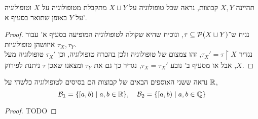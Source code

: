 \subquestion{}
תהיינה $X, Y$ קבוצות, נראה שכל טופולוגיה על $X \sqcup Y$ מתקבלת מטופולוגיה על $X$ וטופולוגיה על $Y$ באופן שתואר בסעיף א'.
\begin{proof}
	נניח ש־$\tau \subseteq \mathcal{P}(X \sqcup Y)$, ונוכיח שהיא שקולה לטופולוגיה המופיעה בסעיף א' עבור איזושהן טופולוגיות $\tau_X, \tau_Y$. \\
	נגדיר $\tau_X' = \tau \restriction X$, זהו צמצום של טופולוגיה ולכן בהכרח טופולוגיה, וכן $\tau_X'$ טופולוגיה מעל $X$, אבל אז מסעיף ב' נובע $\tau_X = \tau_X'$, נגדיר כך גם את $\tau_Y$ ומצאנו שאכן $\tau$ ניתנת לפירוק.
\end{proof}

\question{}
נראה ששני האוספים הבאים של קבוצות הם בסיסים לטופולוגיה כלשהי על $\mathbb{R}$,
\[
	\mathcal{B}_1 = \{ [a, b) \mid a, b \in \mathbb{R} \},
	\quad
	\mathcal{B}_2 = \{ [a, b) \mid a, b \in \mathbb{Q} \}
\]
\begin{proof}
	TODO
\end{proof}


